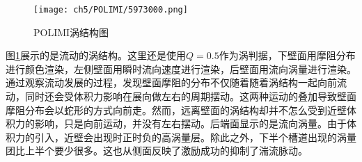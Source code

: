 \begin{figure}[htb]
  \centering
  \texttt{[image: ch5/POLIMI/5973000.png]}
  \caption{POLIMI涡结构图}\label{f:POLIM_vortex_structure}
\end{figure}
图\ref{f:POLIM_vortex_structure}展示的是流动的涡结构。这里还是使用$Q=0.5$作为涡判据，下壁面用摩阻分布进行颜色渲染，左侧壁面用瞬时流向速度进行渲染，后壁面用流向涡量进行渲染。通过观察流动发展的过程，发现壁面摩阻的分布不仅随着随着涡结构一起向前流动，同时还会受体积力影响在展向做左右的周期摆动。这两种运动的叠加导致壁面摩阻分布会以蛇形的方式向前走。然而，远离壁面的涡结构却并不怎么受到近壁体积力的影响，只是向前运动，并没有左右摆动。后端面显示的是流向涡量。由于体积力的引入，近壁会出现时正时负的高涡量层。除此之外，下半个槽道出现的涡量团比上半个要少很多。这也从侧面反映了激励成功的抑制了湍流脉动。


